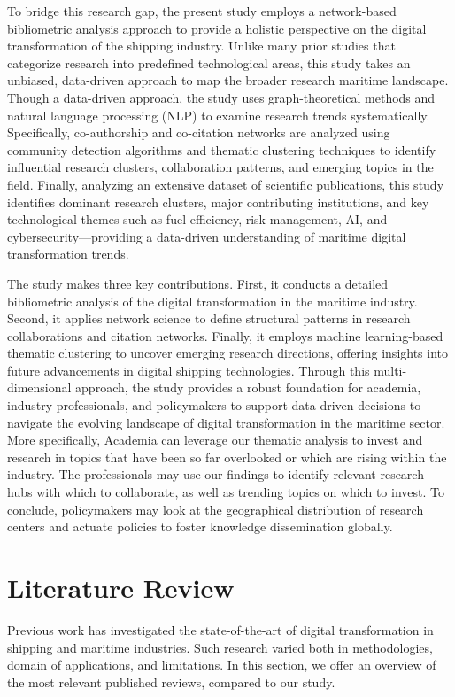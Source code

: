 \documentclass[jmse,review,submit,pdftex,moreauthors]{Definitions/mdpi}
\begin{document}
To bridge this research gap, the present study employs a network-based bibliometric analysis approach to provide a holistic perspective on the digital transformation of the shipping industry. Unlike many prior studies that categorize research into predefined technological areas, this study takes an unbiased, data-driven approach to map the broader research maritime landscape. Though a data-driven approach, the study uses graph-theoretical methods and natural language processing (NLP) to examine research trends systematically. Specifically, co-authorship and co-citation networks are analyzed using community detection algorithms and thematic clustering techniques to identify influential research clusters, collaboration patterns, and emerging topics in the field. Finally, analyzing an extensive dataset of scientific publications, this study identifies dominant research clusters, major contributing institutions, and key technological themes such as fuel efficiency, risk management, AI, and cybersecurity—providing a data-driven understanding of maritime digital transformation trends.

The study makes three key contributions. First, it conducts a detailed bibliometric analysis of the digital transformation in the maritime industry. Second, it applies network science to define structural patterns in research collaborations and citation networks. Finally, it employs machine learning-based thematic clustering to uncover emerging research directions, offering insights into future advancements in digital shipping technologies. Through this multi-dimensional approach, the study provides a robust foundation for academia, industry professionals, and policymakers to support data-driven decisions to navigate the evolving landscape of digital transformation in the maritime sector. More specifically, Academia can leverage our thematic analysis to invest and research in topics that have been so far overlooked or which are rising within the industry. The professionals may use our findings to identify relevant research hubs with which to collaborate, as well as trending topics on which to invest. To conclude, policymakers may look at the geographical distribution of research centers and actuate policies to foster knowledge dissemination globally.  

\section{Literature Review}
Previous work has investigated the state-of-the-art of digital transformation in shipping and maritime industries. Such research varied both in methodologies, domain of applications, and limitations. In this section, we offer an overview of the most relevant published reviews, compared to our study.
\end{document}
